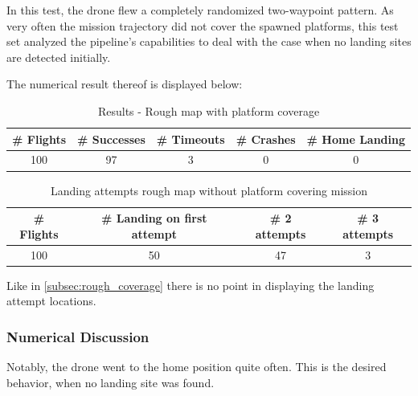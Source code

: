     In this test, the drone flew a completely randomized two-waypoint pattern. As very often the mission trajectory did not cover the spawned platforms, this test set analyzed the pipeline's capabilities to deal with the case when no landing sites are detected initially.

    The numerical result thereof is displayed below:

    \begin{table}[h]
        \begin{center}
         \caption{Results - Rough map with platform coverage}\vspace{1ex}
         \label{tab:result_rough_rand}
         \begin{tabular}{|c|c|c|c|c|}
         \hline
         \# Flights & \# Successes & \# Timeouts & \# Crashes & \# Home Landing\\ \hline \hline
         100 & 97 & 3 & 0 & 0 \\%
         \hline
         \end{tabular}
        \end{center}
    \end{table}

    \begin{table}[h]
        \begin{center}
         \caption{Landing attempts rough map without platform covering mission}\vspace{1ex}
         \label{tab:land_nums_rough_rand}
         \begin{tabular}{|c|c|c|c|}
         \hline
         \# Flights & \# Landing on first attempt & \# 2 attempts & \# 3 attempts\\ \hline \hline
         100 & 50 & 47 & 3 \\%
         \hline
         \end{tabular}
        \end{center}
    \end{table}

    Like in \cref{subsec:rough_coverage} there is no point in displaying the landing attempt locations.

    \subsubsection{Numerical Discussion}

    Notably, the drone went to the home position quite often. This is the desired behavior, when no landing site was found. %
